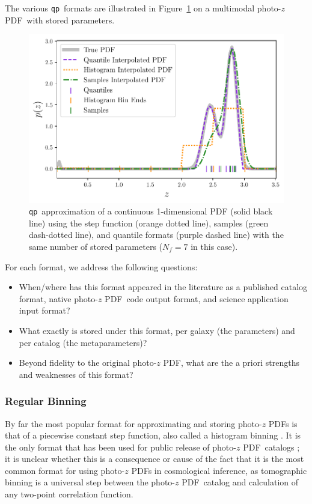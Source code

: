 \documentclass[\docopts]{\docclass}
\newcommand{\qp}{\texttt{qp}}
\newcommand{\pz}{photo-$z$ PDF}
\begin{document}
The various \qp\ formats are illustrated in Figure~\ref{fig:qp} on a multimodal 
\pz\ with stored parameters.
\begin{figure}
  \begin{center}
    \includegraphics[width=\columnwidth]{figures/demo_pz.pdf}
    \caption{\qp\ approximation of a continuous 1-dimensional PDF (solid black 
line) using the step function (orange dotted line), samples (green dash-dotted 
line), and quantile formats (purple dashed line) with the same number of stored 
parameters ($N_{f}=7$ in this case).
    \label{fig:qp}}
  \end{center}
\end{figure}
For each format, we address the following questions:
\begin{itemize}
  \item When/where has this format appeared in the literature as a published 
catalog format, native \pz\ code output format, and science application input 
format?
  \item What exactly is stored under this format, per galaxy (the parameters) 
and per catalog (the metaparameters)?
  \item Beyond fidelity to the original \pz, what are the a priori strengths 
and weaknesses of this format?
\end{itemize}

\subsubsection{Regular Binning}
\label{sec:bins}

By far the most popular format for approximating and storing \pz s is that of a 
piecewise constant step function, also called a histogram binning 
\citep{carrasco_kind_somz:_2014, sadeh_annz2:_2016, cavuoti_metaphor:_2017}.
It is the only format that has been used for public release of \pz\ catalogs 
\citep{tanaka_photometric_2017, sheldon_photometric_2012}; it is unclear 
whether this is a consequence or cause of the fact that it is the most common 
format for using \pz s in cosmological inference, as tomographic binning is a 
universal step between the \pz\ catalog and calculation of any two-point 
correlation function.
\end{document}
